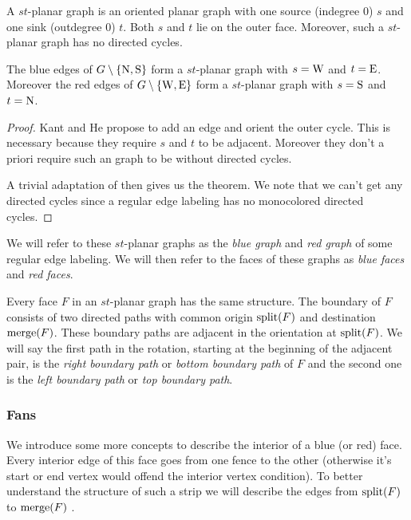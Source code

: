     A $st$-planar graph is an oriented planar graph with one source (indegree 0) $s$ and one sink (outdegree 0) $t$. Both $s$ and $t$ lie on the outer face. Moreover, such a $st$-planar graph has no directed cycles.

    \begin{thrm}
      \label{th:rel:stPlanarGraphs}
      The blue edges of $G\setminus \left\lbrace {\mathrm{N},\mathrm{S}} \right\rbrace$ form a $st$-planar graph with $s= \mathrm{W}$ and $t=\mathrm{E}$. Moreover the red edges of $G\setminus \left\lbrace {\mathrm{W},\mathrm{E}} \right\rbrace$ form a $st$-planar graph with $s= \mathrm{S}$ and $t= \mathrm{N}$.
    \end{thrm}
    \begin{proof}
      Kant and He propose to add an edge and orient the outer cycle. This is necessary because they require $s$ and $t$ to be adjacent. Moreover they don't a priori require such an graph to be without directed cycles.

      A trivial adaptation of \cite[pp.179]{Kant1997} then gives us the theorem. We note that we can't get any directed cycles since a regular edge labeling has no monocolored directed cycles.
    \end{proof}

    We will refer to these $st$-planar graphs as the \emph{blue graph} and \emph{red graph} of some regular edge labeling. We will then refer to the faces of these graphs as \emph{blue faces} and \emph{red faces}.

    Every face $F$ in an $st$-planar graph has the same structure. The boundary of $F$ consists of two directed paths with common origin $\operatorname{split}(F)$ and  destination $\operatorname{merge}(F)$.
    These boundary paths are adjacent in the orientation at $\operatorname{split}(F)$. We will say the first path in the rotation, starting at the beginning of the adjacent pair, is the \emph{right boundary path} or \emph{bottom boundary path} of $F$ and the second one is the \emph{left boundary path} or \emph{top boundary path}.

    \subsubsection{Fans}
    We introduce some more concepts to describe the interior of a blue (or red) face. Every interior edge of this face goes from one fence to the other (otherwise it's start or end vertex would offend the interior vertex condition). To better understand the structure of such a strip we will describe the edges from $\operatorname{split}(F)$ to $\operatorname{merge}(F)$ .

